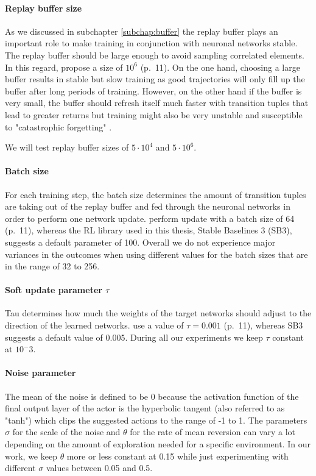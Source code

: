 \paragraph{Replay buffer size}
As we discussed in subchapter \ref{subchap:buffer} the replay buffer plays an important role to make training in conjunction with neuronal networks stable. The replay buffer should be large enough to avoid sampling correlated elements. In this regard, \cite{lillicrap2019continuous} propose a size of $10^6$ (p.~11). On the one hand, choosing a large buffer results in stable but slow training as good trajectories will only fill up the buffer after long periods of training. However, on the other hand if the buffer is very small, the buffer should refresh itself much faster with transition tuples that lead to greater returns but training might also be very unstable and susceptible to "catastrophic forgetting" \cite[]{mccloskey1989catastrophic}.
\par
We will test replay buffer sizes of $5\cdot 10^4$ and $5\cdot 10^6$.

\paragraph{Batch size} For each training step, the batch size determines the amount of transition tuples are taking out of the replay buffer and fed through the neuronal networks in order to perform one network update. \cite{lillicrap2019continuous} perform update with a batch size of 64 (p.~11), whereas the RL library used in this thesis, Stable Baselines 3 (SB3), suggests a default parameter of 100. Overall we do not experience major variances in the outcomes when using different values for the batch sizes that are in the range of 32 to 256. 

\paragraph{Soft update parameter $\tau$} Tau determines how much the weights of the target networks should adjust to the direction of the learned networks. \cite{lillicrap2019continuous} use a value of $\tau = 0.001$ (p.~11), whereas SB3 suggests a default value of 0.005. During all our experiments we keep $\tau$ constant at $10^-3$.

\paragraph{Noise parameter} The mean of the noise is defined to be 0 because the activation function of the final output layer of the actor is the hyperbolic tangent (also referred to as "tanh") which clips the suggested actions to the range of -1 to 1. The parameters $\sigma$ for the scale of the noise and $\theta$ for the rate of mean reversion can vary a lot depending on the amount of exploration needed for a specific environment. In our work, we keep $\theta$ more or less constant at 0.15 while just experimenting with different $\sigma$ values between 0.05 and 0.5. 